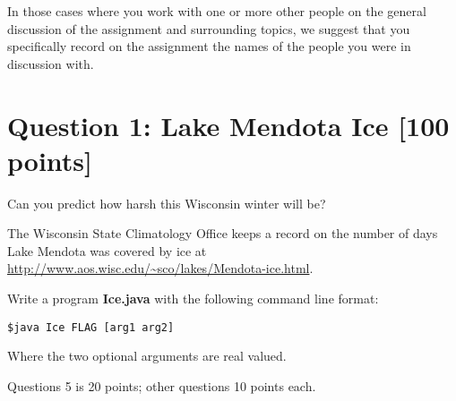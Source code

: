 \documentclass{article}
\begin{document}
In those cases where you work with one or more other people on the general discussion of the assignment and surrounding topics, we suggest that you 
specifically record on the assignment the names of the people you were in discussion with.

\newpage



\section*{Question 1: Lake Mendota Ice [100 points]}

Can you predict how harsh this Wisconsin winter will be?

The Wisconsin State Climatology Office keeps a record on
the number of days Lake Mendota was covered by ice at
\url{http://www.aos.wisc.edu/~sco/lakes/Mendota-ice.html}.

Write a program \textbf{Ice.java} with the following command line format:
\begin{verbatim}
$java Ice FLAG [arg1 arg2]
\end{verbatim}
Where the two optional arguments are real valued.

Questions 5 is 20 points; other questions 10 points each.
\end{document}

